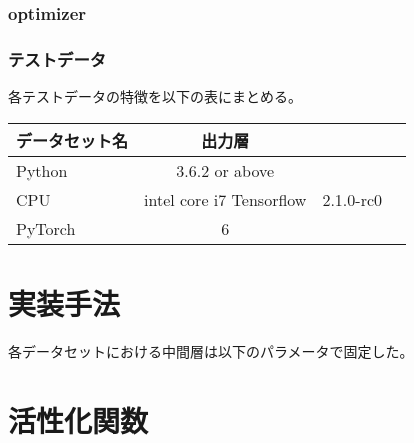 \subsubsection{optimizer}
\subsubsection{テストデータ}
各テストデータの特徴を以下の表にまとめる。


\begin{tabular}{l*{2}{c}r}
データセット名      & 出力層 \\
\hline
Python            & 3.6.2 or above \\
CPU               & intel core i7
Tensorflow        & 2.1.0-rc0 \\
PyTorch           & 6 \\
\end{tabular}





\section{実装手法}

各データセットにおける中間層は以下のパラメータで固定した。


\section{活性化関数}



\section{}
\section{}

